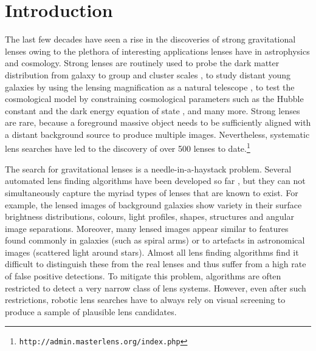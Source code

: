 \documentclass[useAMS,usenatbib,a4paper]{mn2e}
\begin{document}
\section{Introduction}
\label{sec:intro}

The last few decades have seen a rise in the discoveries of strong
gravitational lenses owing to the plethora of interesting applications
lenses have in astrophysics and cosmology. Strong lenses are routinely
used to probe the dark matter distribution from galaxy
\citep[e.g.][]{Koopmans2006,Barnabe2009,Leier2011,Sonnenfeld2015} to group and
cluster scales
\citep[e.g.][]{Limousin2008,Zitrin2011,Oguri2012,More2012,Newman2013}, to
study distant young galaxies by using the lensing magnification as a
natural telescope \citep[e.g.][]{Zitrin2009,Zheng2012,Whitaker2014}, to
test the cosmological model by constraining cosmological parameters such
as the Hubble constant and the dark energy equation of state
\citep[e.g.][]{Suyu2010,Collett2012,Collett2014,Sereno2014}, and many more. Strong
lenses are rare, because a foreground massive object needs to be
sufficiently aligned with a distant background source to produce
multiple images. Nevertheless, systematic lens searches have led to the
discovery of over 500 lenses to
date.\footnote{\texttt{http://admin.masterlens.org/index.php}}

The search for gravitational lenses is a needle-in-a-haystack problem.
Several automated lens finding algorithms have
been developed so far
\citep[e.g.][]{Lenzen2004,Alard2006,Seidel2007,More2012,Brault2014,Gavazzi2014},
but they can not
simultaneously capture the myriad types of lenses that are known to
exist. For example, the lensed images of background galaxies show
variety in their surface brightness distributions, colours, light
profiles, shapes, structures and angular image separations.  Moreover,
many lensed images appear similar to features found commonly in galaxies
(such as spiral arms) or to artefacts in astronomical images (scattered
light around stars).  Almost all lens finding algorithms find it
difficult to distinguish these from the real lenses and thus suffer
from a high rate of false positive detections.  To mitigate this problem,
algorithms are often restricted to detect a very narrow class of lens
systems. However, even after such restrictions, robotic lens searches
have to always rely on visual screening to produce a sample of plausible
lens candidates.
\end{document}
